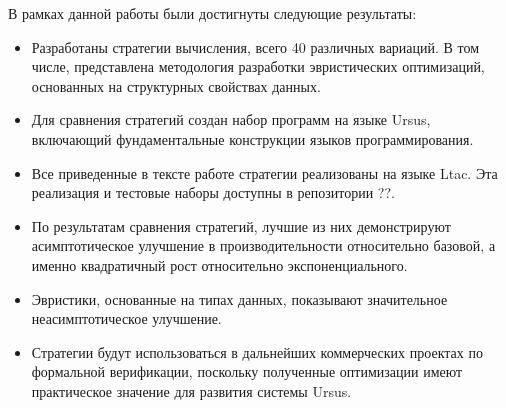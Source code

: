 \documentclass[../diploma.tex]{subfiles}
\begin{document}
В рамках данной работы были достигнуты следующие результаты: 

\begin{itemize}
    \item Разработаны стратегии вычисления, всего 40 различных вариаций. В том числе, представлена методология разработки эвристических оптимизаций, основанных на структурных свойствах данных. 
    \item Для сравнения стратегий создан набор программ на языке Ursus, включающий фундаментальные конструкции языков программирования.
	\item Все приведенные в тексте работе стратегии реализованы на языке Ltac. Эта реализация и тестовые наборы доступны в репозитории ??.
    \item По результатам сравнения стратегий, лучшие из них демонстрируют асимптотическое улучшение в производительности относительно базовой, а именно квадратичный рост относительно экспоненциального.
    \item Эвристики, основанные на типах данных, показывают значительное неасимптотическое улучшение.
    \item Стратегии будут использоваться в дальнейших коммерческих проектах по формальной верификации, поскольку полученные оптимизации имеют практическое значение для развития системы Ursus.
\end{itemize}
\end{document}
